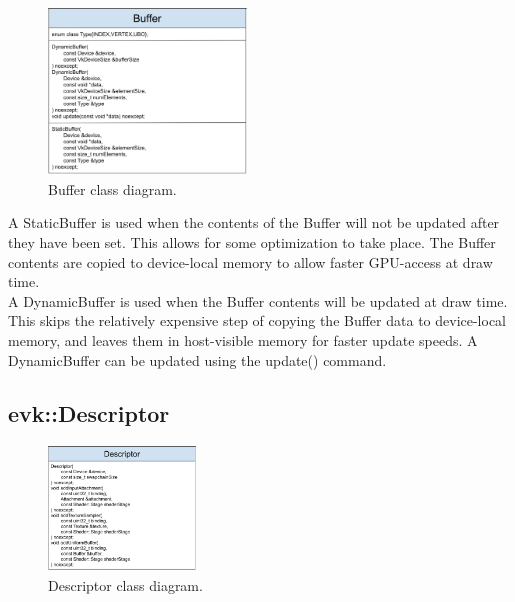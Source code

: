 \documentclass[12pt]{report}
\newcommand{\figurewidth}{0.55\textwidth}
\newcommand{\imagewidth}{0.47\textwidth}
\theoremstyle{definition}
\begin{document}
        \begin{figure}
          \centering
          \includegraphics[width=\imagewidth]{images/class_buffer.png}
          \caption{Buffer class diagram.}
          \label{fig:class_buffer}  
        \end{figure}

        A StaticBuffer is used when the contents of the Buffer will not be
        updated after they have been set. This allows for some optimization
        to take place. The Buffer contents are copied to device-local memory
        to allow faster GPU-access at draw time. \\

        A DynamicBuffer is used when the Buffer contents will be updated at
        draw time. This skips the relatively expensive step of copying the
        Buffer data to device-local memory, and leaves them in host-visible
        memory for faster update speeds. A DynamicBuffer can be updated
        using the update() command.

      \subsection{evk::Descriptor}

        \begin{figure}[h]
          \centering
          \includegraphics[width=0.35\textwidth]{images/class_descriptor.png}
          \caption{Descriptor class diagram.}
          \label{fig:class_descriptor}
        \end{figure}
\end{document}
